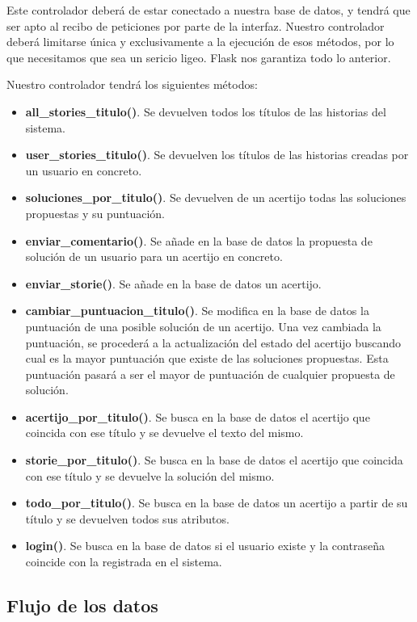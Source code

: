 Este controlador deberá de estar conectado a nuestra base de datos, y tendrá que ser apto al recibo de peticiones por parte de la interfaz. Nuestro controlador deberá limitarse única y exclusivamente a la ejecución de esos métodos, por lo que necesitamos que sea un sericio ligeo. Flask nos garantiza todo lo anterior.

Nuestro controlador tendrá los siguientes métodos:

\begin{itemize}
    \item \textbf{all\_stories\_titulo()}. Se devuelven todos los títulos de las historias del sistema.
    \item \textbf{user\_stories\_titulo()}. Se devuelven los títulos de las historias creadas por un usuario en concreto.
    \item \textbf{soluciones\_por\_titulo()}. Se devuelven de un acertijo todas las soluciones propuestas y su puntuación.
    \item \textbf{enviar\_comentario()}. Se añade en la base de datos la propuesta de solución de un usuario para un acertijo en concreto.
    \item \textbf{enviar\_storie()}. Se añade en la base de datos un acertijo.
    \item \textbf{cambiar\_puntuacion\_titulo()}. Se modifica en la base de datos la puntuación de una posible solución de un acertijo. Una vez cambiada la puntuación, se procederá a la actualización del estado del acertijo buscando cual es la mayor puntuación que existe de las soluciones propuestas. Esta puntuación pasará a ser el mayor de puntuación de cualquier propuesta de solución.
    \item \textbf{acertijo\_por\_titulo()}. Se busca en la base de datos el acertijo que coincida con ese título y se devuelve el texto del mismo.
    \item \textbf{storie\_por\_titulo()}. Se busca en la base de datos el acertijo que coincida con ese título y se devuelve la solución del mismo.
    \item \textbf{todo\_por\_titulo()}. Se busca en la base de datos un acertijo a partir de su título y se devuelven todos sus atributos.
    \item \textbf{login()}. Se busca en la base de datos si el usuario existe y la contraseña coincide con la registrada en el sistema.
\end{itemize}

\subsection{Flujo de los datos}

